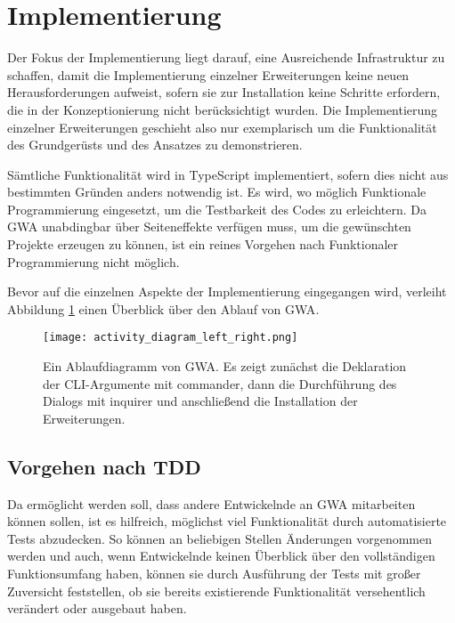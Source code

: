 \section{Implementierung}
\label{implementierung}

Der Fokus der Implementierung liegt darauf, eine Ausreichende Infrastruktur zu schaffen, damit die Implementierung einzelner Erweiterungen keine neuen Herausforderungen aufweist, sofern sie zur Installation keine Schritte erfordern, die in der Konzeptionierung nicht berücksichtigt wurden. Die Implementierung einzelner Erweiterungen geschieht also nur exemplarisch um die Funktionalität des Grundgerüsts und des Ansatzes zu demonstrieren.

Sämtliche Funktionalität wird in TypeScript implementiert, sofern dies nicht aus bestimmten Gründen anders notwendig ist. Es wird, wo möglich Funktionale Programmierung eingesetzt, um die Testbarkeit des Codes zu erleichtern. Da \gls{GWA} unabdingbar über Seiteneffekte verfügen muss, um die gewünschten Projekte erzeugen zu können, ist ein reines Vorgehen nach Funktionaler Programmierung nicht möglich.

Bevor auf die einzelnen Aspekte der Implementierung eingegangen wird, verleiht Abbildung \ref{fig:impl:activity_diagram} einen Überblick über den Ablauf von \gls{GWA}.

  \begin{figure}
	\centering
		\texttt{[image: activity\_diagram\_left\_right.png]}
      	\caption{Ein Ablaufdiagramm von \gls{GWA}. Es zeigt zunächst die Deklaration der \gls{CLI}-Argumente mit commander, dann die Durchführung des Dialogs mit inquirer und anschließend die Installation der Erweiterungen.}
		\label{fig:impl:activity_diagram}
  \end{figure}

\subsection{Vorgehen nach TDD}
Da ermöglicht werden soll, dass andere Entwickelnde an \gls{GWA} mitarbeiten können sollen, ist es hilfreich, möglichst viel Funktionalität durch automatisierte Tests abzudecken. So können an beliebigen Stellen Änderungen vorgenommen werden und auch, wenn Entwickelnde keinen Überblick über den vollständigen Funktionsumfang haben, können sie durch Ausführung der Tests mit großer Zuversicht feststellen, ob sie bereits existierende Funktionalität versehentlich verändert oder ausgebaut haben.

